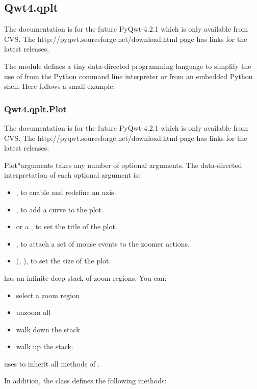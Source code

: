 \documentclass{manual}
\newcommand{\Download}{\ulink{download}
  {http://pyqwt.sourceforge.net/download.html}}
\newcommand{\Future}{
  \begin{notice}[warning]
    The documentation is for the future PyQwt-4.2.1 which is only available
    from CVS. The \Download{} page has links for the latest releases.
  \end{notice}
}
\begin{document}
\subsection{Qwt4.qplt \label{qwt-qplt}}

\Future{}

The module  defines a tiny data-directed programming
language to simplify the use of  from the Python command
line interpreter or from an embedded Python shell.
Here follows a small example:



\subsubsection{Qwt4.qplt.Plot \label{intro-qplt-plot}}

\Future{}

\begin{classdesc}{Plot}{*arguments}
   takes any number of optional arguments.
  The data-directed interpretation of each optional argument is:
  \begin{itemize}
  \item
    , to enable and redefine an axis.
  \item
    , to add a curve to the plot.
  \item
     or a , to set the title of the plot.
  \item
    , to attach a set of mouse events to the zoomer actions.
  \item
    (, ), to set the size of the plot.
  \end{itemize}

   has an infinite deep stack of zoom regions. You can:
  \begin{itemize}
    \item
      select a zoom region
    \item
      unzoom all
    \item
      walk down the stack
    \item
      walk up the stack.
  \end{itemize}

   uses  to inherit all methods of
  .
\end{classdesc}

In addition, the class  defines the following methods:
\end{document}
